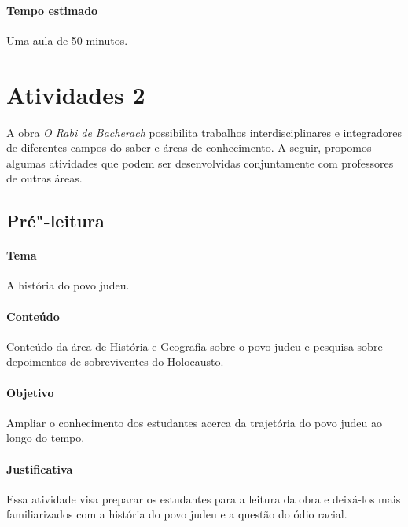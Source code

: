 \documentclass[12pt]{extarticle}
\begin{document}
\paragraph{Tempo estimado} Uma aula de 50 minutos.


\section{Atividades 2}

A obra \emph{O Rabi de Bacherach} possibilita trabalhos
interdisciplinares e integradores de diferentes campos do saber e áreas
de conhecimento. A seguir, propomos algumas atividades que podem ser
desenvolvidas conjuntamente com professores de outras áreas. 

\begin{comment}Além das
habilidades de Linguagens e suas Tecnologias e de Língua Portuguesa,
indicadas nas etapas da seção anterior e válidas também para esta,
listamos a seguir as habilidades de outras áreas, presentes na abordagem
interdisciplinar:
\end{comment}




\subsection{Pré"-leitura}

\paragraph{Tema} A história do povo judeu.

\paragraph{Conteúdo} Conteúdo da área de História e Geografia sobre o povo judeu
e pesquisa sobre depoimentos de sobreviventes do Holocausto.

\paragraph{Objetivo} Ampliar o conhecimento dos estudantes acerca da trajetória
do povo judeu ao longo do tempo.

\paragraph{Justificativa} Essa atividade visa preparar os estudantes para
a leitura da obra e deixá-los mais familiarizados com a história do povo 
judeu e a questão do ódio racial.
\end{document}
